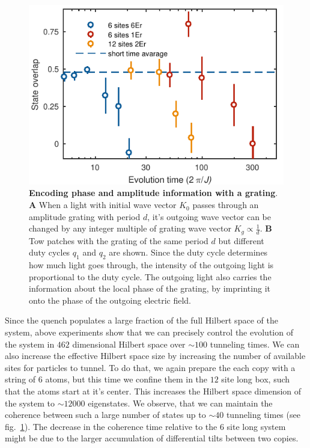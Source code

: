 \begin{figure}[t]
	\centering
	\includegraphics[scale=1]{figures/CBH_MBP_long_time.pdf}
	\caption{{\bf Encoding phase and amplitude information with a grating}. {\bf A} When a light with initial wave vector $K_0$ passes through an amplitude grating with period $d$, it's outgoing wave vector can be changed by any integer multiple of grating wave vector $K_g\propto \frac{1}{d}$. {\bf B} Tow patches with the grating of the same period $d$ but different duty cycles $q_1$ and $q_2$ are shown. Since the duty cycle determines how much light goes through, the intensity of the outgoing light is proportional to the duty cycle. The outgoing light also carries the information about the local phase of the grating, by imprinting it onto the phase of the outgoing electric field.}
	\label{fig:CBH_MBP_long_time}
\end{figure}

Since the quench populates a large fraction of the full Hilbert space of the system, above experiments show that we can precisely control the evolution of the system in $462$ dimensional Hilbert space over $\sim 100$ tunneling times. We can also increase the effective Hilbert space size by increasing the number of available sites for particles to tunnel. To do that, we again prepare the each copy with a string of $6$ atoms, but this time we confine them in the $12$ site long box, such that the atoms start at it's center. This increases the Hilbert space dimension of the system to $\sim 12 000$ eigenstates. We observe, that we can maintain the coherence between such a large number of states up to $\sim 40$ tunneling times (see fig.~\ref{fig:CBH_MBP_long_time}). The decrease in the coherence time relative to the $6$ site long system might be due to the larger accumulation of differential tilts between two copies.  

